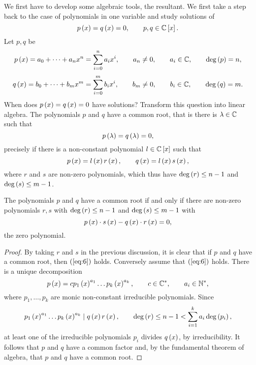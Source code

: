 We first have to develop some algebraic tools, the resultant. We first take a step back to the case of polynomials in one variable and study solutions of
$$ p\left( x \right) = q\left( x \right) = 0, \qquad p, q \in \mathbb{C}\left[ x \right]. $$
Let $ p, q $ be
$$ p\left( x \right) = a_0 + \dots + a_nx^n = \sum_{i = 0}^n a_ix^i, \qquad a_n \ne 0, \qquad a_i \in \mathbb{C}, \qquad \deg\left( p \right) = n, $$
$$ q\left( x \right) = b_0 + \dots + b_mx^m = \sum_{i = 0}^m b_ix^i, \qquad b_m \ne 0, \qquad b_i \in \mathbb{C}, \qquad \deg\left( q \right) = m. $$
When does $ p\left( x \right) = q\left( x \right) = 0 $ have solutions? Transform this question into linear algebra. The polynomials $ p $ and $ q $ have a common root, that is there is $ \lambda \in \mathbb{C} $ such that
$$ p\left( \lambda \right) = q\left( \lambda \right) = 0, $$
precisely if there is a non-constant polynomial $ l \in \mathbb{C}\left[ x \right] $ such that
$$ p\left( x \right) = l\left( x \right)r\left( x \right), \qquad q\left( x \right) = l\left( x \right)s\left( x \right), $$
where $ r $ and $ s $ are non-zero polynomials, which thus have $ \deg\left( r \right) \le n - 1 $ and $ \deg\left( s \right) \le m - 1 $.

\begin{lemma}
\label{lem:9.1}
The polynomials $ p $ and $ q $ have a common root if and only if there are non-zero polynomials $ r, s $ with $ \deg\left( r \right) \le n - 1 $ and $ \deg\left( s \right) \le m - 1 $ with
\begin{equation}
\label{eq:6}
p\left( x \right) \cdot s\left( x \right) - q\left( x \right) \cdot r\left( x \right) = 0,
\end{equation}
the zero polynomial.
\end{lemma}

\begin{proof}
By taking $ r $ and $ s $ in the previous discussion, it is clear that if $ p $ and $ q $ have a common root, then $ \left( \ref{eq:6} \right) $ holds. Conversely assume that $ \left( \ref{eq:6} \right) $ holds. There is a unique decomposition
$$ p\left( x \right) = cp_1\left( x \right)^{a_1} \dots p_k\left( x \right)^{a_k}, \qquad c \in \mathbb{C}^*, \qquad a_i \in \mathbb{N}^*, $$
where $ p_1, \dots, p_k $ are monic non-constant irreducible polynomials. Since
$$ p_1\left( x \right)^{a_1} \dots p_k\left( x \right)^{a_k} \mid q\left( x \right)r\left( x \right), \qquad \deg\left( r \right) \le n - 1 < \sum_{i = 1}^k a_i \deg\left( p_i \right), $$
at least one of the irreducible polynomials $ p_i $ divides $ q\left( x \right) $, by irreducibility. It follows that $ p $ and $ q $ have a common factor and, by the fundamental theorem of algebra, that $ p $ and $ q $ have a common root.
\end{proof}

